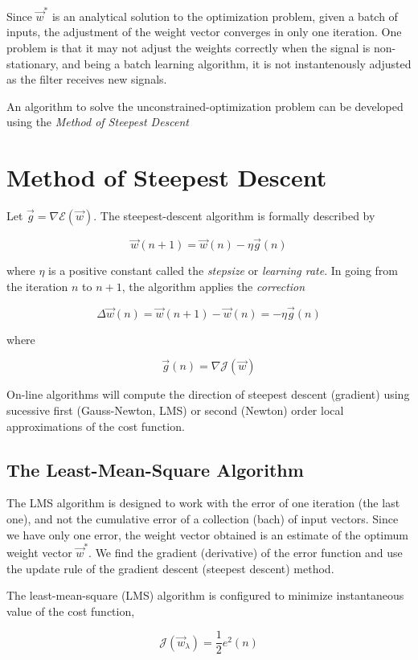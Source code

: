 \documentclass[twocolumn]{article}
\begin{document}
Since $ \vec{w}^{*} $ is an analytical solution to the optimization problem, given a batch of inputs, the adjustment of the weight vector converges in only one iteration. One problem is that it may not adjust the weights correctly when the signal is non-stationary, and being a batch learning algorithm, it is not instantenously adjusted as the filter receives new signals.

An algorithm to solve the unconstrained-optimization problem can be developed using the \textit{Method of Steepest Descent}

\section{Method of Steepest Descent}

Let $ \vec{g} = \nabla \mathcal{E} ( \vec{w} ) $. The steepest-descent algorithm is formally described by

$$ \vec{w} (n + 1) = \vec{w} (n) - \eta \vec{g} (n) $$

\noindent where $ \eta $ is a positive constant called the \textit{stepsize} or \textit{learning rate}. In going from the iteration $ n $ to $ n + 1 $, the algorithm applies the \textit{correction}

$$ \Delta \vec{w} (n)  = \vec{w} (n + 1) - \vec{w} (n) = - \eta \vec{g} (n)$$

\noindent where

$$ \vec{g} (n) = \nabla \mathcal{J} (\vec{w})$$

On-line algorithms will compute the direction of steepest descent (gradient) using sucessive first (Gauss-Newton, LMS) or second (Newton) order local approximations of the cost function.

\subsection{The Least-Mean-Square Algorithm}
The LMS algorithm is designed to work with the error of one iteration (the last one), and not the cumulative error of a collection (bach) of input vectors. Since we have only one error, the weight vector obtained is an estimate of the optimum weight vector $\vec{w}^{*}$. We find the gradient (derivative) of the error function and use the update rule of the gradient descent (steepest descent) method.

The least-mean-square (LMS) algorithm is configured to minimize instantaneous value of the cost function,

$$ \mathcal{J} ( \vec{w}_{\lambda} ) = \dfrac{1}{2} e^{2} (n) $$
\end{document}

